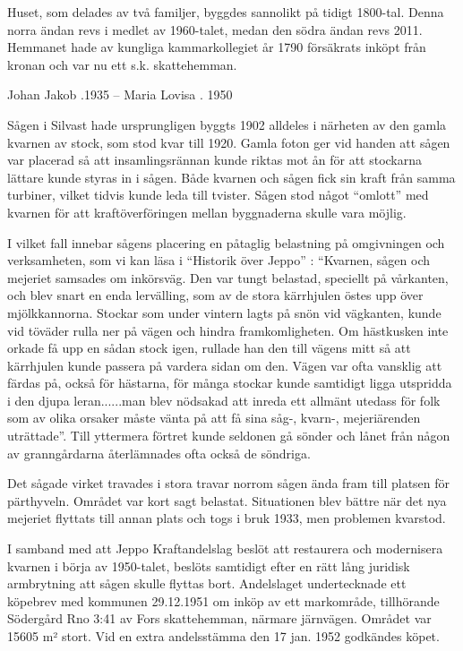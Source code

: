 Huset, som delades av två familjer, byggdes sannolikt på tidigt 1800-tal. Denna norra ändan revs i medlet av 1960-talet, medan den södra ändan revs 2011. Hemmanet hade av kungliga kammarkollegiet år 1790 försäkrats inköpt från kronan och var nu ett s.k. skattehemman.

Johan Jakob .1935  --  Maria Lovisa . 1950





Sågen i Silvast hade ursprungligen byggts 1902 alldeles i närheten av den gamla kvarnen av stock, som stod kvar till 1920. Gamla foton ger vid handen att sågen var placerad så att insamlingsrännan kunde riktas mot ån för att stockarna lättare kunde styras in i sågen. Både kvarnen och sågen fick sin kraft från samma turbiner, vilket tidvis kunde leda till tvister. Sågen stod något ``omlott'' med kvarnen för att
kraftöverföringen mellan byggnaderna skulle vara möjlig.

I vilket fall innebar sågens placering en påtaglig belastning på omgivningen och verksamheten, som vi kan läsa i ``Historik över Jeppo'' : ``Kvarnen, sågen och mejeriet samsades om inkörsväg. Den var tungt belastad, speciellt på vårkanten, och blev snart en enda lervälling, som av de stora kärrhjulen östes upp över mjölkkannorna. Stockar som under vintern lagts på snön vid vägkanten, kunde vid töväder rulla ner på vägen och hindra framkomligheten. Om hästkusken inte orkade få upp en sådan stock igen, rullade han den till vägens mitt så att kärrhjulen kunde passera på vardera sidan om den. Vägen var ofta vansklig att färdas på, också för hästarna, för många stockar kunde samtidigt ligga utspridda i den djupa leran......man blev nödsakad att inreda ett allmänt utedass för folk som av olika orsaker måste vänta på att få sina såg-, kvarn-, mejeriärenden uträttade''. Till yttermera förtret kunde seldonen gå sönder och lånet från någon av granngårdarna återlämnades ofta också de söndriga.

Det sågade virket travades i stora travar norrom sågen ända fram till platsen för pärthyveln. Området var kort sagt belastat. Situationen blev bättre när det nya mejeriet flyttats till annan plats och togs i bruk 1933, men problemen kvarstod.

I samband med att Jeppo Kraftandelslag beslöt att restaurera och modernisera kvarnen i börja av 1950-talet, beslöts samtidigt efter en rätt lång juridisk armbrytning att sågen skulle flyttas bort. Andelslaget undertecknade ett köpebrev med kommunen 29.12.1951 om inköp av ett markområde, tillhörande Södergård Rno 3:41 av Fors skattehemman, närmare järnvägen. Området var 15605 m² stort. Vid en extra andelsstämma den 17 jan. 1952 godkändes köpet.


